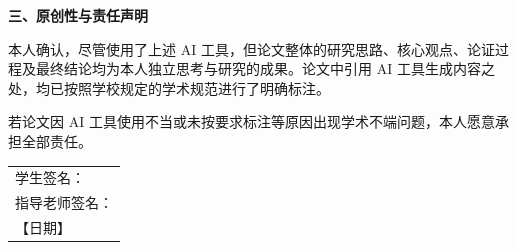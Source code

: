 \vspace{1em}

\noindent\textbf{三、原创性与责任声明}

\vspace{0.5em}

\noindent\hspace{2em}本人确认，尽管使用了上述 AI 工具，但论文整体的研究思路、核心观点、论证过程及最终结论均为本人独立思考与研究的成果。论文中引用 AI 工具生成内容之处，均已按照学校规定的学术规范进行了明确标注。

\vspace{0.6em}

\noindent\hspace{2em}若论文因 AI 工具使用不当或未按要求标注等原因出现学术不端问题，本人愿意承担全部责任。

\vspace{3em}

\begin{flushright}
    \begin{tabular}{@{}l@{}}
        学生签名：\hspace{4cm}\\[1.2em]
        指导老师签名：\hspace{4cm}\\[1.2em]
        【日期】 \hspace{4cm}
    \end{tabular}
\end{flushright}